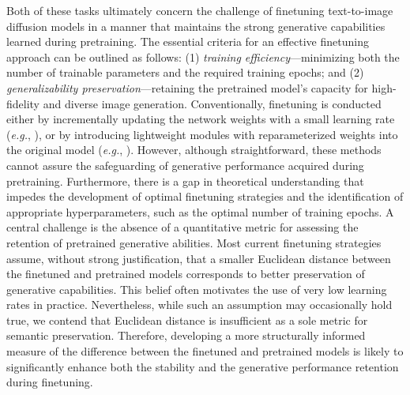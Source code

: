Both of these tasks ultimately concern the challenge of finetuning text-to-image diffusion models in a manner that maintains the strong generative capabilities learned during pretraining. The essential criteria for an effective finetuning approach can be outlined as follows: (1) \emph{training efficiency}—minimizing both the number of trainable parameters and the required training epochs; and (2) \emph{generalizability preservation}—retaining the pretrained model's capacity for high-fidelity and diverse image generation. Conventionally, finetuning is conducted either by incrementally updating the network weights with a small learning rate (\emph{e.g.}, \cite{ruiz2023dreambooth}), or by introducing lightweight modules with reparameterized weights into the original model (\emph{e.g.}, \cite{hulora2022,zhang2023adding}). However, although straightforward, these methods cannot assure the safeguarding of generative performance acquired during pretraining. Furthermore, there is a gap in theoretical understanding that impedes the development of optimal finetuning strategies and the identification of appropriate hyperparameters, such as the optimal number of training epochs. A central challenge is the absence of a quantitative metric for assessing the retention of pretrained generative abilities. Most current finetuning strategies assume, without strong justification, that a smaller Euclidean distance between the finetuned and pretrained models corresponds to better preservation of generative capabilities. This belief often motivates the use of very low learning rates in practice. Nevertheless, while such an assumption may occasionally hold true, we contend that Euclidean distance is insufficient as a sole metric for semantic preservation. Therefore, developing a more structurally informed measure of the difference between the finetuned and pretrained models is likely to significantly enhance both the stability and the generative performance retention during finetuning.

